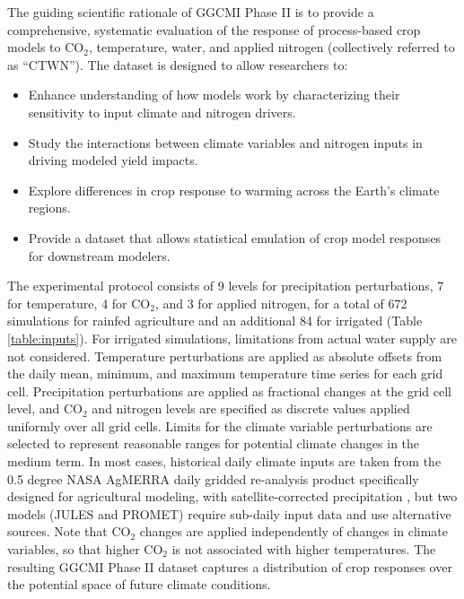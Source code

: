 \documentclass[esd, manuscript]{copernicus} %
\begin{document}
The guiding scientific rationale of GGCMI Phase II is to provide a comprehensive, systematic evaluation of the response of process-based crop models to CO$_2$, temperature, water, and applied nitrogen (collectively referred to as ``CTWN'').
The dataset is designed to allow researchers to:
\begin{itemize}
    \item Enhance understanding of how models work by characterizing their sensitivity to input climate and nitrogen drivers.
    \item Study the interactions between climate variables and nitrogen inputs in driving modeled yield impacts. 
    \item Explore differences in crop response to warming across the Earth's climate regions.
    \item Provide a dataset that allows statistical emulation of crop model responses for downstream modelers.
\end{itemize}
\vspace{-0.05in}

The experimental protocol consists of 9 levels for precipitation perturbations, 7 for temperature, 4 for CO$_2$, and 3 for applied nitrogen, for a total of 672 simulations for rainfed agriculture and an additional 84 for irrigated (Table \ref{table:inputs}). For irrigated simulations, limitations from actual water supply are not considered. Temperature perturbations are applied as absolute offsets from the daily mean, minimum, and maximum temperature time series for each grid cell. Precipitation perturbations are applied as fractional changes at the grid cell level, and CO$_2$ and nitrogen levels are specified as discrete values applied uniformly over all grid cells. Limits for the climate variable perturbations are selected to represent reasonable ranges for potential climate changes in the medium term. In most cases, historical daily climate inputs are taken from the 0.5 degree NASA AgMERRA daily gridded re-analysis product specifically designed for agricultural modeling, with satellite-corrected precipitation \citep{Ruane2015}, but two models (JULES and PROMET) require sub-daily input data and use alternative sources. Note that CO$_2$ changes are applied independently of changes in climate variables, so that higher CO$_2$ is not associated with higher temperatures. The resulting GGCMI Phase II dataset captures a distribution of crop responses over the potential space of future climate conditions.
\end{document}
